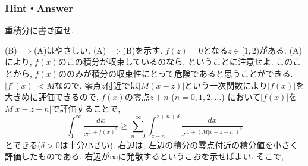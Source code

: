 \subsubsection{Hint・Answer}
{\small

\begin{probans}
\end{probans}
\begin{probans}
\end{probans}
\begin{probans}
\end{probans}
\begin{probans}
\end{probans}
\begin{probans}
\chatgpthint{区間$[k/n,(k+1)/n)$ごとに積分してください。}
\end{probans}
\begin{probans}
\end{probans}
\begin{probans}
\end{probans}
\begin{probans}
重積分に書き直せ.
\end{probans}
\begin{probans}
\end{probans}
\begin{probans} %
(B)$\implies$(A)はやさしい. (A)$\implies$(B)を示す.
$f(z) = 0$となる$z\in [1,2)$がある.  (A)により, $f(x)$のこの積分が収束しているのなら, ということに注意せよ. このことから, $f(x)$ののみが積分の収束性にとって危険であると思うことができる. $|f'(x)|<M$なので, 零点$z$付近では$|M(x-z)|$という一次関数により$|f(x)|$を大きめに評価できるので, $f(x)$の零点$z+n$ ($n=0,1,2,\dots$) において$|f(x)|$を$M|x-z-n|$で評価することで, \[\int_{1}^{\infty} \dfrac{dx}{x^{1+f(x)^2}} \geq \sum_{n=0}^{\infty} \int_{z+n}^{z+n+\delta} \dfrac{dx}{x^{1+(M|x-z-n|)^2}}\]
とできる($\delta>0$は十分小さい). 右辺は, 左辺の積分の零点付近の積分値を小さく評価したものである. 右辺が$\infty$に発散するというこおを示せばよい. そこで,

\end{probans}}
